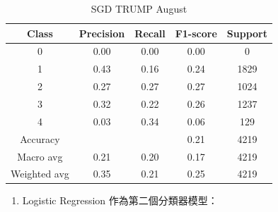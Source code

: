 \begin{enumerate}
\begin{table}[H]
        \vspace{1em}
        
        \scriptsize
        \begin{tabular}{c|cccc}
        \hline
        Class & Precision & Recall & F1-score & Support \\
        \hline
        0 & 0.00 & 0.00 & 0.00 & 0 \\
        1 & 0.43 & 0.16 & 0.24 & 1829 \\
        2 & 0.27 & 0.27 & 0.27 & 1024 \\
        3 & 0.32 & 0.22 & 0.26 & 1237 \\
        4 & 0.03 & 0.34 & 0.06 & 129 \\
        \hline
        Accuracy &       &      & 0.21 & 4219 \\
        Macro avg & 0.21 & 0.20 & 0.17 & 4219 \\
        Weighted avg & 0.35 & 0.21 & 0.25 & 4219 \\
        \hline
        \end{tabular}
        \caption{SGD TRUMP August}
        \label{tab:classifier_1_report_sgd_trump_filtered_aug}
        \end{table}

        \pagebreak

            \begin{enumerate}
                \item Logistic Regression 作為第二個分類器模型：


\end{enumerate}
\end{enumerate}
